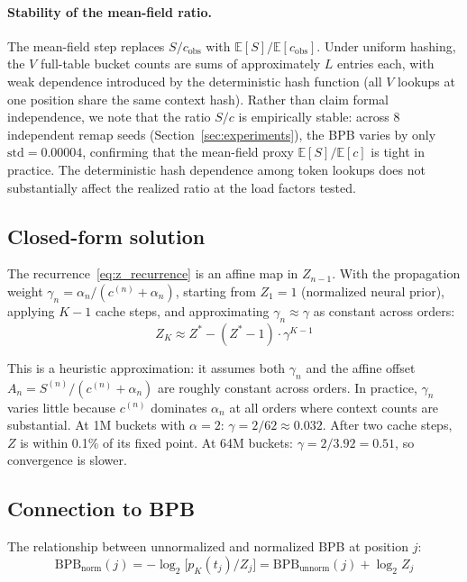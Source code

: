 \documentclass[11pt]{article}
\newcommand{\bpb}{\text{BPB}}
\newcommand{\E}{\mathbb{E}}
\begin{document}
\paragraph{Stability of the mean-field ratio.} The mean-field step replaces $S/c_{\text{obs}}$ with $\E[S]/\E[c_{\text{obs}}]$. Under uniform hashing, the $V$ full-table bucket counts are sums of approximately $L$ entries each, with weak dependence introduced by the deterministic hash function (all $V$ lookups at one position share the same context hash). Rather than claim formal independence, we note that the ratio $S/c$ is empirically stable: across 8 independent remap seeds (Section~\ref{sec:experiments}), the BPB varies by only $\text{std} = 0.00004$, confirming that the mean-field proxy $\E[S]/\E[c]$ is tight in practice. The deterministic hash dependence among token lookups does not substantially affect the realized ratio at the load factors tested.

\subsection{Closed-form solution}

The recurrence~\eqref{eq:z_recurrence} is an affine map in $Z_{n-1}$. With the propagation weight $\gamma_n = \alpha_n/(c^{(n)} + \alpha_n)$, starting from $Z_1 = 1$ (normalized neural prior), applying $K - 1$ cache steps, and approximating $\gamma_n \approx \gamma$ as constant across orders:
\begin{equation}
Z_K \approx Z^* - (Z^* - 1) \cdot \gamma^{K-1}
\label{eq:closed_form}
\end{equation}

This is a heuristic approximation: it assumes both $\gamma_n$ and the affine offset $A_n = S^{(n)}/(c^{(n)} + \alpha_n)$ are roughly constant across orders. In practice, $\gamma_n$ varies little because $c^{(n)}$ dominates $\alpha_n$ at all orders where context counts are substantial. At 1M buckets with $\alpha = 2$: $\gamma = 2/62 \approx 0.032$. After two cache steps, $Z$ is within 0.1\% of its fixed point. At 64M buckets: $\gamma = 2/3.92 = 0.51$, so convergence is slower.

\subsection{Connection to BPB}

The relationship between unnormalized and normalized BPB at position $j$:
\[
\bpb_{\text{norm}}(j) = -\log_2\!\big[p_K(t_j) / Z_j\big] = \bpb_{\text{unnorm}}(j) + \log_2 Z_j
\]
\end{document}
